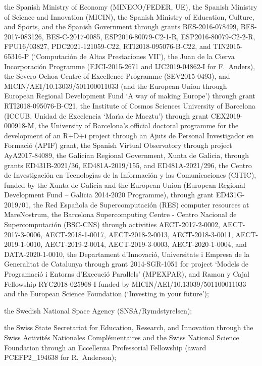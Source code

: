 the Spanish Ministry of Economy (MINECO/FEDER, UE), the Spanish Ministry of Science and Innovation (MICIN), the Spanish Ministry of Education, Culture, and Sports, and the Spanish Government through grants BES-2016-078499, BES-2017-083126, BES-C-2017-0085, ESP2016-80079-C2-1-R, ESP2016-80079-C2-2-R, FPU16/03827, PDC2021-121059-C22, RTI2018-095076-B-C22, and TIN2015-65316-P (`Computaci\'{o}n de Altas Prestaciones VII'), the Juan de la Cierva Incorporaci\'{o}n Programme (FJCI-2015-2671 and IJC2019-04862-I for F.~Anders), the Severo Ochoa Centre of Excellence Programme (SEV2015-0493), and MICIN/AEI/10.13039/501100011033 (and the European Union through European Regional Development Fund `A way of making Europe') through grant RTI2018-095076-B-C21, the Institute of Cosmos Sciences University of Barcelona (ICCUB, Unidad de Excelencia `Mar\'{\i}a de Maeztu') through grant CEX2019-000918-M, the University of Barcelona's official doctoral programme for the development of an R+D+i project through an Ajuts de Personal Investigador en Formaci\'{o} (APIF) grant, the Spanish Virtual Observatory through project AyA2017-84089, the Galician Regional Government, Xunta de Galicia, through grants ED431B-2021/36, ED481A-2019/155, and ED481A-2021/296, the Centro de Investigaci\'{o}n en Tecnolog\'{\i}as de la Informaci\'{o}n y las Comunicaciones (CITIC), funded by the Xunta de Galicia and the European Union (European Regional Development Fund -- Galicia 2014-2020 Programme), through grant ED431G-2019/01, the Red Espa\~{n}ola de Supercomputaci\'{o}n (RES) computer resources at MareNostrum, the Barcelona Supercomputing Centre - Centro Nacional de Supercomputaci\'{o}n (BSC-CNS) through activities AECT-2017-2-0002, AECT-2017-3-0006, AECT-2018-1-0017, AECT-2018-2-0013, AECT-2018-3-0011, AECT-2019-1-0010, AECT-2019-2-0014, AECT-2019-3-0003, AECT-2020-1-0004, and DATA-2020-1-0010, the Departament d'Innovaci\'{o}, Universitats i Empresa de la Generalitat de Catalunya through grant 2014-SGR-1051 for project `Models de Programaci\'{o} i Entorns d'Execuci\'{o} Parallels' (MPEXPAR), and Ramon y Cajal Fellowship RYC2018-025968-I funded by MICIN/AEI/10.13039/501100011033 and the European Science Foundation (`Investing in your future');

the Swedish National Space Agency (SNSA/Rymdstyrelsen);

the Swiss State Secretariat for Education, Research, and Innovation through the Swiss Activit\'{e}s Nationales Compl\'{e}mentaires and the Swiss National Science Foundation through an Eccellenza Professorial Fellowship (award PCEFP2\_194638 for R.~Anderson);

